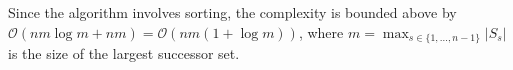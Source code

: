 \documentclass[dissertation,draft*]{aaltoseries}
\begin{document}
Since the algorithm involves sorting, the complexity is bounded above by $\mathcal{O}(n m \log m + nm) = \mathcal{O}(n m (1+\log m))$,
where $m = \max_{s \in \{1,\ldots,n-1\}}|S_s|$ is the size of the largest successor set. 

% 
% 




\end{document}
